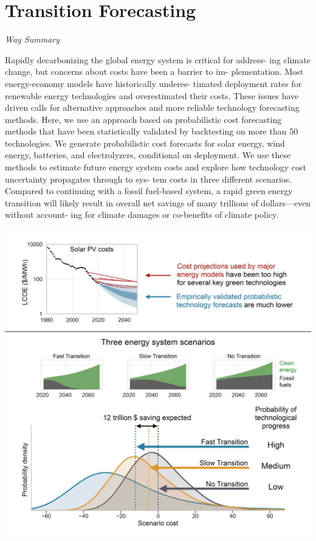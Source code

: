 \documentclass[
]{book}
\begin{document}
\hypertarget{transition-forecasting}{%
\section{Transition Forecasting}\label{transition-forecasting}}

\emph{Way Summary}

Rapidly decarbonizing the global energy system is critical for address-
ing climate change, but concerns about costs have been a barrier to im-
plementation. Most energy-economy models have historically underes-
timated deployment rates for renewable energy technologies and
overestimated their costs. These issues have driven calls for alternative
approaches and more reliable technology forecasting methods. Here,
we use an approach based on probabilistic cost forecasting methods
that have been statistically validated by backtesting on more than 50
technologies. We generate probabilistic cost forecasts for solar energy,
wind energy, batteries, and electrolyzers, conditional on deployment.
We use these methods to estimate future energy system costs and
explore how technology cost uncertainty propagates through to sys-
tem costs in three different scenarios. Compared to continuing with a
fossil fuel-based system, a rapid green energy transition will likely result
in overall net savings of many trillions of dollars---even without account-
ing for climate damages or co-benefits of climate policy.

\includegraphics{fig/transition_scenarios.png}
\end{document}
